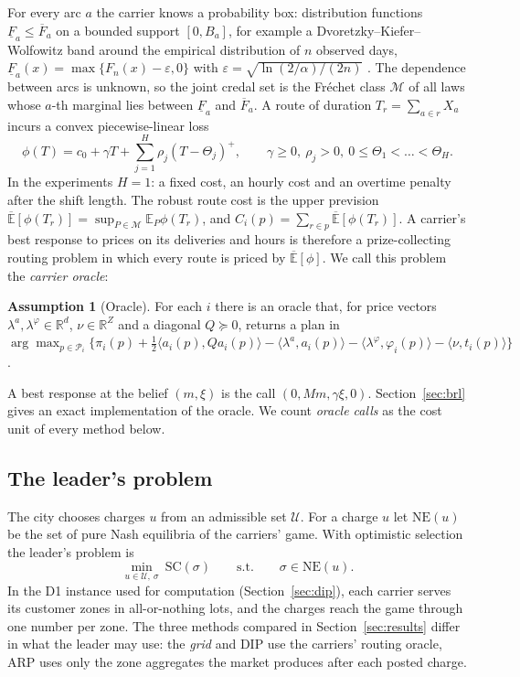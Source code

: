 \documentclass[preprint,11pt]{elsarticle}
\theoremstyle{definition}
\newtheorem{assumption}{Assumption}
\theoremstyle{remark}
\newcommand{\R}{\mathbb{R}}
\newcommand{\E}{\mathbb{E}}
\newcommand{\cP}{\mathcal{P}}
\newcommand{\cM}{\mathcal{M}}
\newcommand{\Eu}{\overline{\mathbb{E}}}
\newcommand{\Fl}{\underline{F}}
\newcommand{\Fu}{\overline{F}}
\newcommand{\pos}[1]{\left(#1\right)^{+}}
\newcommand{\ip}[2]{\langle #1,#2\rangle}
\begin{document}
For every arc $a$ the carrier knows a probability box: distribution functions $\Fl_a\le\Fu_a$ on a bounded support $[0,B_a]$, for example a Dvoretzky--Kiefer--Wolfowitz band around the empirical distribution of $n$ observed days, $\Fl_a(x)=\max\{F_n(x)-\varepsilon,0\}$ with $\varepsilon=\sqrt{\ln(2/\alpha)/(2n)}$ \citep{DKW1956,Massart1990}. The dependence between arcs is unknown, so the joint credal set is the Fr\'echet class $\cM$ of all laws whose $a$-th marginal lies between $\Fl_a$ and $\Fu_a$. A route of duration $T_r=\sum_{a\in r}X_a$ incurs a convex piecewise-linear loss
\begin{equation}\label{eq:loss}
\phi(T)=c_0+\gamma T+\textstyle\sum_{j=1}^{H}\rho_j\pos{T-\Theta_j},\qquad \gamma\ge0,\ \rho_j>0,\ 0\le\Theta_1<\dots<\Theta_H.
\end{equation}
In the experiments $H=1$: a fixed cost, an hourly cost and an overtime penalty after the shift length. The robust route cost is the upper prevision $\Eu[\phi(T_r)]=\sup_{P\in\cM}\E_P\phi(T_r)$, and $C_i(p)=\sum_{r\in p}\Eu[\phi(T_r)]$. A carrier's best response to prices on its deliveries and hours is therefore a prize-collecting routing problem in which every route is priced by $\Eu[\phi]$. We call this problem the \emph{carrier oracle}:
\begin{assumption}[Oracle]\label{ass:oracle}
For each $i$ there is an oracle that, for price vectors $\lambda^a,\lambda^\varphi\in\R^d$, $\nu\in\R^Z$ and a diagonal $Q\succeq0$, returns a plan in $\arg\max_{p\in\cP_i}\{\pi_i(p)+\tfrac12\ip{a_i(p)}{Qa_i(p)}-\ip{\lambda^a}{a_i(p)}-\ip{\lambda^\varphi}{\varphi_i(p)}-\ip{\nu}{t_i(p)}\}$.
\end{assumption}
A best response at the belief $(m,\xi)$ is the call $(0,Mm,\gamma\xi,0)$. Section~\ref{sec:brl} gives an exact implementation of the oracle. We count \emph{oracle calls} as the cost unit of every method below.

\subsection{The leader's problem}

The city chooses charges $u$ from an admissible set $\mathcal U$. For a charge $u$ let $\mathrm{NE}(u)$ be the set of pure Nash equilibria of the carriers' game. With optimistic selection the leader's problem is
\begin{equation}\label{eq:bilevel}
\min_{u\in\mathcal U,\ \sigma}\ \mathrm{SC}(\sigma)\qquad\text{s.t.}\qquad\sigma\in\mathrm{NE}(u).
\end{equation}
In the D1 instance used for computation (Section~\ref{sec:dip}), each carrier serves its customer zones in all-or-nothing lots, and the charges reach the game through one number per zone. The three methods compared in Section~\ref{sec:results} differ in what the leader may use: the \emph{grid} and DIP use the carriers' routing oracle, ARP uses only the zone aggregates the market produces after each posted charge.
\end{document}

